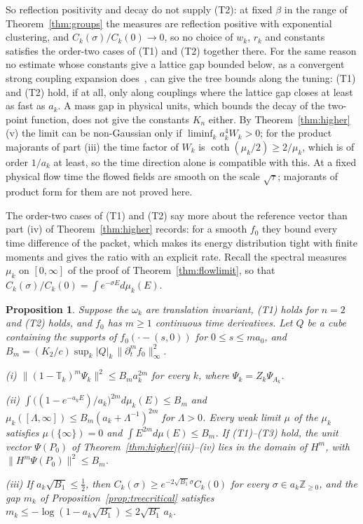 \documentclass[aps,prd,twocolumn,superscriptaddress,nofootinbib,longbibliography,floatfix,amsmath,amssymb,10pt]{revtex4-2}
\newtheorem{proposition}[theorem]{Proposition}
\theoremstyle{definition}
\theoremstyle{remark}
\newcommand{\Z}{\mathbb{Z}}
\begin{document}
So reflection positivity and decay do not supply (T2): at fixed $\beta$
in the range of Theorem~\ref{thm:groups} the measures are reflection
positive with exponential clustering, and $C_k(\sigma)/C_k(0)\to0$, so no
choice of $w_k$, $r_k$ and constants satisfies the order-two cases of (T1)
and (T2) together there. For the same reason no
estimate whose constants give a lattice gap bounded below, as a convergent
strong coupling expansion does~\cite{OSei78}, can give the tree bounds along
the tuning: (T1) and (T2) hold, if at all, only along couplings where the lattice
gap closes at least as fast as $a_k$. A mass gap in physical units,
which bounds the decay of the two-point function, does not give the constants
$K_n$ either. By Theorem~\ref{thm:higher}(v) the limit can be non-Gaussian
only if $\liminf_ka_k^4W_k>0$; for the product majorants of part (iii) the
time factor of $W_k$ is $\coth(\mu_k/2)\ge2/\mu_k$, which is of order $1/a_k$
at least, so the time direction alone is compatible with this. At a fixed
physical flow time the flowed fields are smooth on the scale $\sqrt\tau$;
majorants of product form for them are not proved here.

The order-two cases of (T1) and (T2) say more about the reference vector than
part (iv) of Theorem~\ref{thm:higher} records: for a smooth $f_0$ they bound
every time difference of the packet, which makes its energy distribution tight
with finite moments and gives the ratio with an explicit rate. Recall the
spectral measures $\mu_k$ on $[0,\infty]$ of the proof of
Theorem~\ref{thm:flowlimit}, so that
$C_k(\sigma)/C_k(0)=\int e^{-\sigma E}d\mu_k(E)$.

\begin{proposition}\label{prop:treeenergy}
Suppose the $\omega_k$ are translation invariant, \textup{(T1)} holds for
$n=2$ and \textup{(T2)} holds, and $f_0$ has $m\ge1$ continuous time
derivatives. Let $Q$ be a cube containing the supports of $f_0(\cdot-(s,0))$
for $0\le s\le m a_0$, and
$B_m=(K_2/c)\sup_k|Q|_k\,\|\partial_t^mf_0\|_\infty^2$.

\textup{(i)} $\|(1-\mathbb T_k)^m\Psi_k\|^2\le B_ma_k^{2m}$ for every $k$,
where $\Psi_k=Z_k\Psi_{A_k}$.

\textup{(ii)} $\int\bigl((1-e^{-a_kE})/a_k\bigr)^{2m}d\mu_k(E)\le B_m$ and
$\mu_k([\Lambda,\infty])\le B_m(a_k+\Lambda^{-1})^{2m}$ for $\Lambda>0$. Every
weak limit $\mu$ of the $\mu_k$ satisfies $\mu(\{\infty\})=0$ and
$\int E^{2m}d\mu(E)\le B_m$. If \textup{(T1)--(T3)} hold, the unit vector
$\Psi(P_0)$ of Theorem~\textup{\ref{thm:higher}(iii)--(iv)} lies in the domain
of $H^m$, with $\|H^m\Psi(P_0)\|^2\le B_m$.

\textup{(iii)} If $a_k\sqrt{B_1}\le\frac12$, then
$C_k(\sigma)\ge e^{-2\sqrt{B_1}\sigma}C_k(0)$ for every $\sigma\in a_k\Z_{\ge0}$,
and the gap $m_k$ of Proposition~\textup{\ref{prop:treecritical}} satisfies
$m_k\le-\log(1-a_k\sqrt{B_1})\le2\sqrt{B_1}\,a_k$.
\end{proposition}
\end{document}
